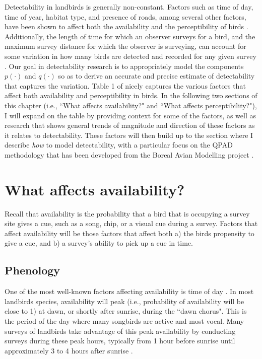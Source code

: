 \par Detectability in landbirds is generally non-constant. 
Factors such as time of day, time of year, habitat type, and presence of roads, among several other factors, have been shown to affect both the availability and the perceptibility of birds \citep{wilson_reliability_1985, solymos_calibrating_2013, johnston_species_2014, cooke_road_2020}. 
Additionally, the length of time for which an observer surveys for a bird, and the maximum survey distance for which the observer is surveying, can account for some variation in how many birds are detected and recorded for any given survey \citep{alldredge_factors_2007, solymos_calibrating_2013, buckland_distance_2015}.  
Our goal in detectability research is to appropriately model the components $p(\cdot)$ and $q(\cdot)$ so as to derive an accurate and precise estimate of detectability that captures the variation.
Table 1 of \citet{johnson_defense_2008} nicely captures the various factors that affect both availability and perceptibility in birds.
In the following two sections of this chapter (i.e., ``What affects availability?" and ``What affects perceptibility?"), I will expand on the table by providing context for some of the factors, as well as research that shows general trends of magnitude and direction of these factors as it relates to detectability.
These factors will then build up to the section where I describe \textit{how} to model detectability, with a particular focus on the QPAD methodology that has been developed from the Boreal Avian Modelling project \citep{solymos_calibrating_2013}.


\section{What affects availability?}

\par Recall that availability is the probability that a bird that is occupying a survey site gives a cue, such as a song, chip, or a visual cue during a survey.
Factors that affect availability will be those factors that affect both a) the birds propensity to give a cue, and b) a survey's ability to pick up a cue in time.

\subsection{Phenology}
\par One of the most well-known factors affecting availability is time of day \citep{robbins_effect_1981}.
In most landbirds species, availability will peak (i.e., probability of availability will be close to 1) at dawn, or shortly after sunrise, during the ``dawn chorus".
This is the period of the day where many songbirds are active and most vocal.
Many surveys of landbirds take advantage of this peak availability by conducting surveys during these peak hours, typically from 1 hour before sunrise until approximately 3 to 4 hours after sunrise \citep{marsh_correcting_1989}.

